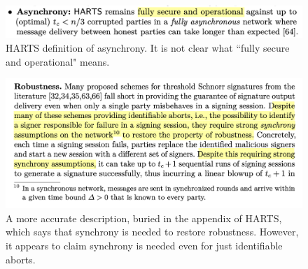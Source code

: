 \begin{figure}
    \centering
    \includegraphics[width=1\linewidth]{images/HARTS_async_defn.png}
    \caption{HARTS definition of asynchrony. It is not clear what ``fully secure and operational" means.}
\end{figure}

\begin{figure}
    \centering
    \includegraphics[width=1\linewidth]{images/HARTS_appendix.png}
    \caption{A more accurate description, buried in the appendix of HARTS, which says that synchrony is needed to restore robustness.  However, it appears to claim synchrony is needed even for just identifiable aborts.}
\end{figure}

%
%

